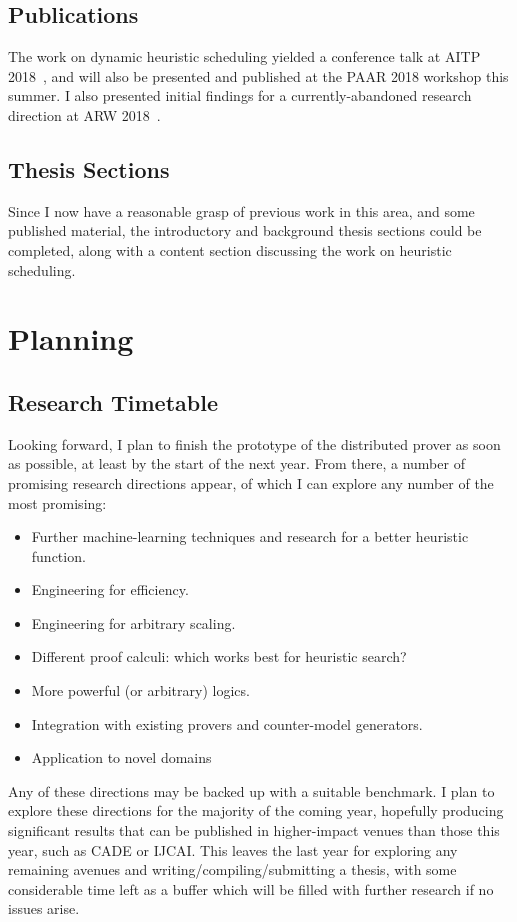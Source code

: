 \documentclass[a4paper, 10pt]{article}
\begin{document}
\subsection{Publications}
The work on dynamic heuristic scheduling yielded a conference talk at AITP 2018~\cite{AITP}, and will also be presented and published at the PAAR 2018 workshop this summer.
I also presented initial findings for a currently-abandoned research direction at ARW 2018~\cite{ARW}.

\subsection{Thesis Sections}
Since I now have a reasonable grasp of previous work in this area, and some published material, the introductory and background thesis sections could be completed, along with a content section discussing the work on heuristic scheduling.

\section{Planning}
\subsection{Research Timetable}
Looking forward, I plan to finish the prototype of the distributed prover as soon as possible, at least by the start of the next year.
From there, a number of promising research directions appear, of which I can explore any number of the most promising:
\begin{itemize}
	\item Further machine-learning techniques and research for a better heuristic function.
	\item Engineering for efficiency.
	\item Engineering for arbitrary scaling.
	\item Different proof calculi: which works best for heuristic search?
	\item More powerful (or arbitrary) logics.
	\item Integration with existing provers and counter-model generators.
	\item Application to novel domains
\end{itemize}
Any of these directions may be backed up with a suitable benchmark.
I plan to explore these directions for the majority of the coming year, hopefully producing significant results that can be published in higher-impact venues than those this year, such as CADE or IJCAI.
This leaves the last year for exploring any remaining avenues and writing/compiling/submitting a thesis, with some considerable time left as a buffer which will be filled with further research if no issues arise.
\end{document}
